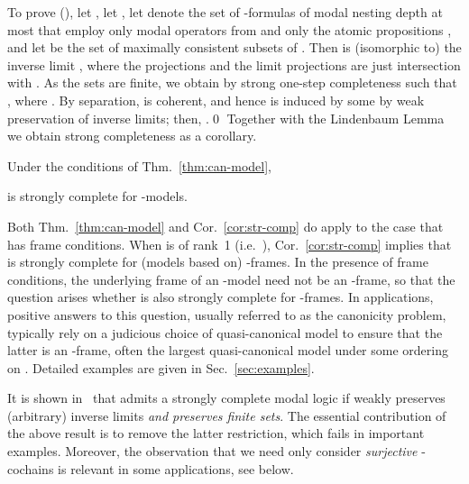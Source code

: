 \documentclass[proceedings]{stacs}
\theoremstyle{definition}
\theoremstyle{plain}
\begin{document}
  To prove (), let , let
  , let  denote the set of
  -formulas of modal nesting depth at most  that employ
  only modal operators from  and only the
  atomic propositions , and let  be the set of
  maximally consistent subsets of . Then  is (isomorphic
  to) the inverse limit , where the projections
   and the limit projections  are just
  intersection with . As the sets  are finite, we
  obtain by strong one-step completeness  such that
  , where
  . By separation,
   is coherent, and hence is induced by some  by weak preservation of inverse limits; then,
  .\qed
\noindent
Together with the Lindenbaum Lemma we obtain strong completeness as
a corollary.
\begin{cor} \label{cor:str-comp}
Under the conditions of Thm.~\ref{thm:can-model},

is strongly complete for -models.
\end{cor}
\noindent Both Thm.~\ref{thm:can-model} and
Cor.~\ref{cor:str-comp} do apply to the case that  has
frame conditions. When  is of rank~1 (i.e.\
), Cor.~\ref{cor:str-comp} implies that 
is strongly complete for (models based on) -frames.  In the
presence of frame conditions, the underlying frame of an -model
need not be an -frame, so that the question arises whether
 is also strongly complete for -frames. In applications,
positive answers to this question, usually referred to as the
canonicity problem, typically rely on a judicious choice of
quasi-canonical model to ensure that the latter is an -frame,
often the largest quasi-canonical model under some ordering on
. Detailed examples are given in Sec.~\ref{sec:examples}.
\begin{rem}
  It is shown in~\cite{KurzRosicky} that  admits a strongly
  complete modal logic if  weakly preserves (arbitrary) inverse
  limits \emph{and preserves finite sets}. The essential contribution
  of the above result is to remove the latter restriction, which fails
  in important examples. Moreover, the observation that we need only
  consider \emph{surjective} -cochains is relevant in some
  applications, see below.
\end{rem}
\end{document}
